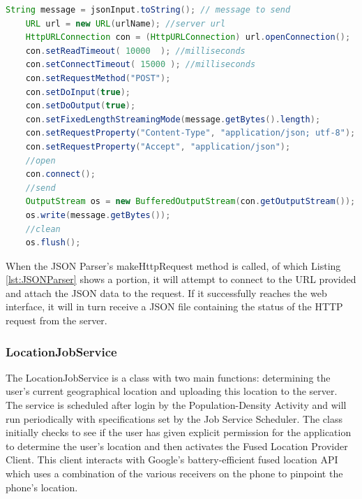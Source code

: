 \begin{lstlisting}[caption={JSONParser sending a JSON variable to the web interface.},label={lst:JSONParser},language=Java]
    String message = jsonInput.toString(); // message to send
    URL url = new URL(urlName); //server url
    HttpURLConnection con = (HttpURLConnection) url.openConnection();
    con.setReadTimeout( 10000  ); //milliseconds
    con.setConnectTimeout( 15000 ); //milliseconds
    con.setRequestMethod("POST");
    con.setDoInput(true);
    con.setDoOutput(true);
    con.setFixedLengthStreamingMode(message.getBytes().length);
    con.setRequestProperty("Content-Type", "application/json; utf-8");
    con.setRequestProperty("Accept", "application/json");
    //open
    con.connect();
    //send
    OutputStream os = new BufferedOutputStream(con.getOutputStream());
    os.write(message.getBytes());
    //clean
    os.flush();
\end{lstlisting}

When the JSON Parser's makeHttpRequest method is called, of which Listing \ref{lst:JSONParser} shows a portion, it will attempt to connect to the URL provided and attach the JSON data to the request. If it successfully reaches the web interface, it will in turn receive a JSON file containing the status of the HTTP request from the server.

\subsubsection{LocationJobService}
The LocationJobService is a class with two main functions: determining the user's current geographical location and uploading this location to the server. The service is scheduled after login by the Population-Density Activity and will run periodically with specifications set by the Job Service Scheduler. The class initially checks to see if the user has given explicit permission for the application to determine the user's location and then activates the Fused Location Provider Client. This client interacts with Google's battery-efficient fused location API which uses a combination of the various receivers on the phone to pinpoint the phone's location.

